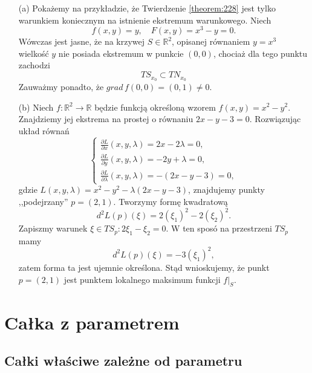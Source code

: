 \documentclass[leqno]{article}
\begin{document}
\begin{justify}
\begin{ex}
    \begin{itemize}
        \item [(a)]
            Pokażemy na przykładzie, że Twierdzenie \ref{theorem:228} jest tylko warunkiem koniecznym na istnienie ekstremum warunkowego. Niech 
            \[
                f(x,y) = y, \quad F(x,y) = x^3 - y = 0.
            \]
            Wówczas jest jasne, że na krzywej $S \in \mathbb{R}^2$, opisanej równaniem $y = x^3$ wielkość $y$ nie posiada ekstremum w punkcie $(0,0)$, chociaż dla tego 
            punktu zachodzi
            \[
                TS_{x_0} \subset TN_{x_0}
            \]
            Zauważmy ponadto, że $grad \, f(0,0) = (0, 1) \neq 0$.
        \item [(b)]
            Niech $f : \mathbb{R}^2 \to \mathbb{R}$ będzie funkcją określoną wzorem $f(x,y) = x^2 - y^2$. Znajdziemy jej ekstrema na prostej o równaniu $2x - y - 3 = 0$. 
            Rozwiązując układ równań 
            \[
                \begin{cases}
                    \frac{\partial L}{\partial x}(x,y,\lambda) = 2x - 2\lambda = 0, \\
                    \frac{\partial L}{\partial y}(x,y,\lambda) = -2y + \lambda = 0, \\
                    \frac{\partial L}{\partial \lambda}(x,y,\lambda) = -(2x - y - 3) = 0,
                \end{cases}
            \]
            gdzie $L(x,y,\lambda) = x^2 - y^2 - \lambda(2x-y-3)$, znajdujemy punkty ,,podejrzany'' $p = (2,1)$. Tworzymy formę kwadratową 
            \[
                d^2L(p)(\xi) = 2{(\xi_1)}^2 - 2{(\xi_2)}^2.
            \]
            Zapiszmy warunek $\xi \in TS_p : 2\xi_1 - \xi_2 = 0$. W ten sposó na przestrzeni $TS_p$ mamy 
            \[
                d^2L(p)(\xi) = -3{(\xi_1)}^2,
            \]
            zatem forma ta jest ujemnie określona. Stąd wnioskujemy, że punkt $p = (2,1)$ jest punktem lokalnego maksimum funkcji $f|_S$. 
    \end{itemize}
\end{ex}

\newpage

\section{Całka z parametrem}
\subsection{Całki właściwe zależne od parametru}


\end{justify}
\end{document}
